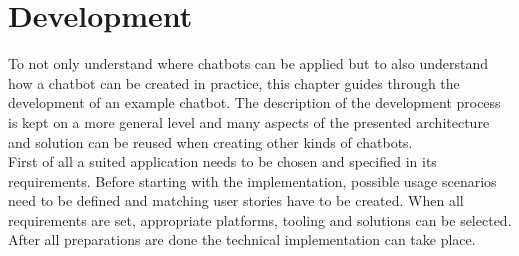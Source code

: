 \chapter{Development}


To not only understand where chatbots can be applied but to also understand how a chatbot can be created in practice, this chapter guides through the development of an example chatbot.
The description of the development process is kept on a more general level and many aspects of the presented architecture and solution can be reused when creating other kinds of chatbots.
\\
First of all a suited application needs to be chosen and specified in its requirements.
Before starting with the implementation, possible usage scenarios need to be defined and matching user stories have to be created.
When all requirements are set, appropriate platforms, tooling and solutions can be selected.
After all preparations are done the technical implementation can take place.
